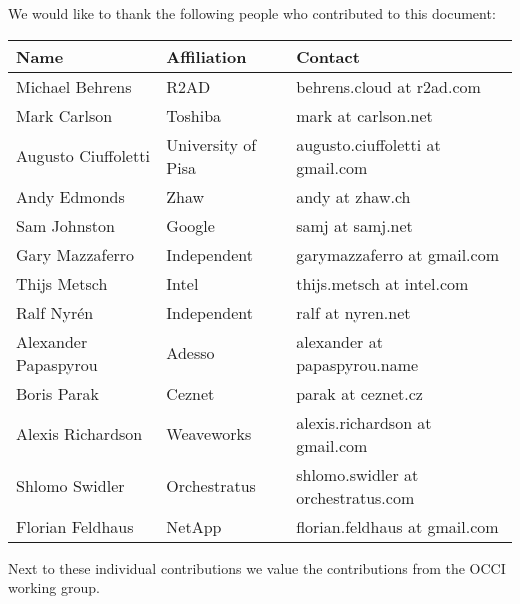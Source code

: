 
We would like to thank the following people who contributed to this
document:

\begin{tabular}{l|p{2in}|p{2in}}
Name & Affiliation & Contact \\
\hline
Michael Behrens & R2AD & behrens.cloud at r2ad.com \\
Mark Carlson & Toshiba & mark at carlson.net \\
Augusto Ciuffoletti & University of Pisa & augusto.ciuffoletti at gmail.com\\
Andy Edmonds & Zhaw & andy at zhaw.ch \\
Sam Johnston & Google & samj at samj.net \\
Gary Mazzaferro & Independent &  garymazzaferro at gmail.com \\ 
Thijs Metsch & Intel & thijs.metsch at intel.com \\
Ralf Nyrén & Independent & ralf at nyren.net \\
Alexander Papaspyrou & Adesso & alexander at papaspyrou.name \\
Boris Parak & Ceznet & parak at ceznet.cz \\
Alexis Richardson & Weaveworks & alexis.richardson at gmail.com \\
Shlomo Swidler & Orchestratus & shlomo.swidler at orchestratus.com \\
Florian Feldhaus & NetApp & florian.feldhaus at gmail.com \\
\end{tabular}

Next to these individual contributions we value the contributions from
the OCCI working group.
